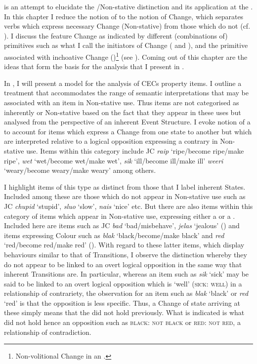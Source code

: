  is an attempt to elucidate the \slash Non-stative distinction and
its application at the .  In this chapter I reduce the notion of
 to the notion of Change, which separates verbs which express
necessary Change (Non-stative) from those which do not (cf.
\citealt{Comrie1976}).  I discuss the feature Change as indicated by different
(combinations of) primitives such as what I call the initiators of Change (\CAUSE
and \DO), and the primitive associated with inchoative Change
(\BECOME)\footnote{Non-volitional Change in an .}  (see
\citealt{Dowty1979,Carter1976,McCawley1968}). Coming out of this chapter are the
ideas that form the basis for the analysis that I present in .

In , I will present a model for the analysis of CECs property items.
I outline a treatment that accommodates the range of semantic interpretations
that may be associated with an item in Non-stative use.  Thus items are not
categorised as inherently  or Non-stative based on the fact that they
appear in these uses but analysed from the perspective of an inherent Event
Structure.  I evoke  notion of a
 to account for items which express a Change from one state to another
but which are interpreted relative to a logical opposition expressing a contrary
in Non-stative use. Items within this category include JC \textit{raip}
`ripe\slash become ripe\slash make ripe', \textit{wet} `wet\slash become wet\slash make wet',
\textit{sik} `ill\slash become ill\slash make ill' \textit{weeri} `weary\slash become weary\slash make
weary' among others.

I highlight items of this type as distinct from those that I label inherent
States. Included among these are those which do not appear in Non-stative use
such as JC \textit{chupid} `stupid', \textit{sluo} `slow', \textit{nais} `nice'
etc. But there are also items within this category of  items which appear
in Non-stative use, expressing either a   or a .
Included here are items such as JC \textit{bad} `bad\slash misbehave', \textit{jelas}
`jealous' () and items expressing Colour such as \textit{blak}
`black\slash become\slash make black' and \textit{red} `red\slash become red\slash make red'
(). With regard to these latter items, which display behaviours
similar to that of Transitions, I observe the distinction whereby they do not
appear to be linked to an overt logical opposition in the same way that inherent
Transitions are. In particular, whereas an item such as \textit{sik} `sick' may
be said to be linked to an overt logical opposition which is `well' (\textsc{sick: well})
in a relationship of contrariety, the observation for an item such as
\textit{blak} `black' or \textit{red} `red' is that the opposition is less
specific. Thus, a Change of state arriving at these simply means that the 
did not hold previously. What is indicated is what did not hold hence an
opposition such as \textsc{black: not black} or \textsc{red: not red}, a relationship of
contradiction.

